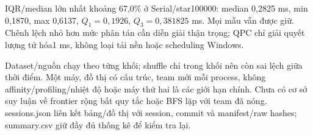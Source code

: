 IQR/median lớn nhất khoảng 67,0\% ở Serial/star100000: median 0,2825 ms, min 0,1870, max 0,6137, $Q_1=0,1926$, $Q_3=0,381825$ ms. Mọi mẫu vẫn được giữ. Chênh lệch nhỏ hơn mức phân tán cần diễn giải thận trọng; QPC chỉ giải quyết lượng tử hóa1 ms, không loại tải nền hoặc scheduling Windows.

Dataset/nguồn chạy theo từng khối; shuffle chỉ trong khối nên còn sai lệch giữa thời điểm. Một máy, đồ thị có cấu trúc, team mới mỗi process, không affinity/profiling/nhiệt độ hoặc máy thứ hai là các giới hạn chính. Chưa có cơ sở suy luận về frontier rộng bất quy tắc hoặc BFS lặp với team đã nóng. sessions.json liên kết bảng/đồ thị với session, commit và manifest/raw hashes; summary.csv giữ đầy đủ thống kê để kiểm tra lại.
